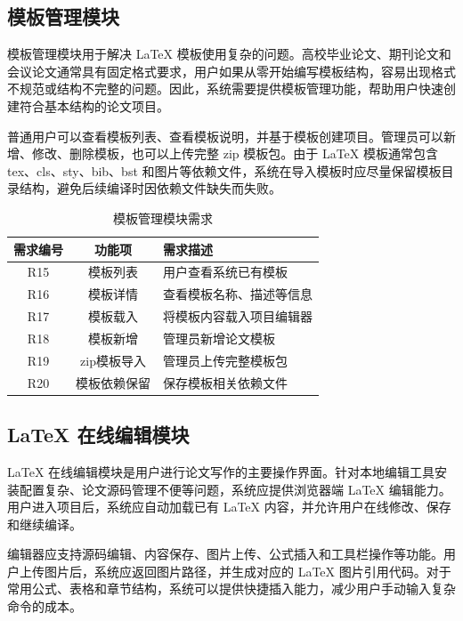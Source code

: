 \documentclass{xduugthesis}
\begin{document}
\subsection{模板管理模块}
模板管理模块用于解决 LaTeX 模板使用复杂的问题。高校毕业论文、期刊论文和会议论文通常具有固定格式要求，用户如果从零开始编写模板结构，容易出现格式不规范或结构不完整的问题。因此，系统需要提供模板管理功能，帮助用户快速创建符合基本结构的论文项目。

普通用户可以查看模板列表、查看模板说明，并基于模板创建项目。管理员可以新增、修改、删除模板，也可以上传完整 zip 模板包。由于 LaTeX 模板通常包含 tex、cls、sty、bib、bst 和图片等依赖文件，系统在导入模板时应尽量保留模板目录结构，避免后续编译时因依赖文件缺失而失败。

\begin{table}[!ht]
    \centering
    \caption{模板管理模块需求}
    \label{tab:template-requirement}
    \begin{tabular}{|c|c|p{7cm}|}
        \hline
        需求编号 & 功能项 & 需求描述 \\
        \hline
        R15 & 模板列表 & 用户查看系统已有模板 \\
        \hline
        R16 & 模板详情 & 查看模板名称、描述等信息 \\
        \hline
        R17 & 模板载入 & 将模板内容载入项目编辑器 \\
        \hline
        R18 & 模板新增 & 管理员新增论文模板 \\
        \hline
        R19 & zip模板导入 & 管理员上传完整模板包 \\
        \hline
        R20 & 模板依赖保留 & 保存模板相关依赖文件 \\
        \hline
    \end{tabular}
\end{table}

\subsection{LaTeX 在线编辑模块}
LaTeX 在线编辑模块是用户进行论文写作的主要操作界面。针对本地编辑工具安装配置复杂、论文源码管理不便等问题，系统应提供浏览器端 LaTeX 编辑能力。用户进入项目后，系统应自动加载已有 LaTeX 内容，并允许用户在线修改、保存和继续编译。

编辑器应支持源码编辑、内容保存、图片上传、公式插入和工具栏操作等功能。用户上传图片后，系统应返回图片路径，并生成对应的 LaTeX 图片引用代码。对于常用公式、表格和章节结构，系统可以提供快捷插入能力，减少用户手动输入复杂命令的成本。
\end{document}
